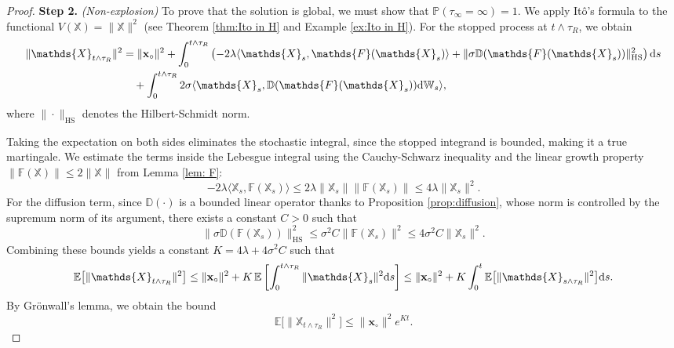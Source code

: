 \documentclass[12pt]{amsart}
\newcommand{\D}[1]{\mbox{\rm #1}}
\newcommand{\dd}{\D{d}}
\numberwithin{equation}{section}
\begin{document}
\begin{proof}
\textbf{Step 2.} \textit{(Non-explosion)} 
To prove that the solution is global, we must show that $\mathbb{P}(\tau_{\infty} = \infty) = 1$. We apply It\^o's formula to the functional $V(\mathds{X}) = \|\mathds{X}\|^{2}$ (see Theorem \ref{thm:Ito in H} and Example \ref{ex:Ito in H}). For the stopped process at $t \wedge \tau_{R}$, we obtain 
\begin{equation*}
\begin{aligned}
    \|\mathds{X}_{t \wedge \tau_{R}}\|^{2} &= \|\mathbf{x}_{\circ}\|^{2} + \int_{0}^{t \wedge \tau_{R}} \left( -2\lambda \langle \mathds{X}_{s}, \mathds{F}(\mathds{X}_{s}) \rangle + \|\sigma\mathbb{D}(\mathds{F}(\mathds{X}_{s}))\|_{\text{HS}}^{2} \right) \dd s \\
    &\quad + \int_{0}^{t \wedge \tau_{R}} 2\sigma \langle \mathds{X}_{s}, \mathbb{D}(\mathds{F}(\mathds{X}_{s})) \dd \mathbb{W}_{s} \rangle,
\end{aligned}
\end{equation*}
where $\|\cdot\|_{\text{HS}}$ denotes the Hilbert-Schmidt norm. 

Taking the expectation on both sides eliminates the stochastic integral, since the stopped integrand is bounded, making it a true martingale. We estimate the terms inside the Lebesgue integral using the Cauchy-Schwarz inequality and the linear growth property $\|\mathds{F}(\mathds{X})\| \leq 2\|\mathds{X}\|$ from Lemma \ref{lem: F}:
\begin{equation*}
    -2\lambda \langle \mathds{X}_{s}, \mathds{F}(\mathds{X}_{s}) \rangle \leq 2\lambda \|\mathds{X}_{s}\| \|\mathds{F}(\mathds{X}_{s})\| \leq 4\lambda \|\mathds{X}_{s}\|^{2}.
\end{equation*}
For the diffusion term, since $\mathbb{D}(\cdot)$ is a bounded linear operator thanks to Proposition \ref{prop:diffusion}, whose norm is controlled by the supremum norm of its argument, there exists a constant $C > 0$ such that 
\begin{equation*}
    \|\sigma\mathbb{D}(\mathds{F}(\mathds{X}_{s}))\|_{\text{HS}}^{2} \leq \sigma^{2} C \|\mathds{F}(\mathds{X}_{s})\|^{2} \leq 4\sigma^{2} C \|\mathds{X}_{s}\|^{2}.
\end{equation*}
Combining these bounds yields a constant $K = 4\lambda + 4\sigma^{2}C$ such that 
\begin{equation*}
    \mathbb{E}\big[\|\mathds{X}_{t \wedge \tau_{R}}\|^{2}\big] \leq \|\mathbf{x}_{\circ}\|^{2} + K \, \mathbb{E} \left[ \int_{0}^{t \wedge \tau_{R}} \|\mathds{X}_{s}\|^{2} \dd s \right] \leq \|\mathbf{x}_{\circ}\|^{2} + K \int_{0}^{t} \mathbb{E}\big[\|\mathds{X}_{s \wedge \tau_{R}}\|^{2}\big] \dd s.
\end{equation*}
By Gr\"onwall's lemma, we obtain the bound
\begin{equation*}
    \mathbb{E}\big[\|\mathds{X}_{t \wedge \tau_{R}}\|^{2}\big] \leq \|\mathbf{x}_{\circ}\|^{2} e^{Kt}.
\end{equation*}



\end{proof}
\end{document}
